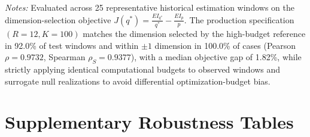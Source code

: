 \documentclass[review,12pt,authoryear]{elsarticle}
\begin{document}
\begin{table}[htbp]
\centering
\caption{Optimization Budget Calibration against High-Budget Reference Configuration ($R=25, K=150$).}
\label{tab:optimizer_calibration}
\begin{minipage}{\textwidth}
\vspace{4pt}
\scriptsize \emph{Notes:} Evaluated across 25 representative historical estimation windows on the dimension-selection objective $J(q^*) = \frac{EI_{q^*}}{q^*} - \frac{EI_p}{p}$. The production specification $(R=12, K=100)$ matches the dimension selected by the high-budget reference in 92.0\% of test windows and within $\pm 1$ dimension in 100.0\% of cases (Pearson $\rho = 0.9732$, Spearman $\rho_S = 0.9377$), with a median objective gap of 1.82\%, while strictly applying identical computational budgets to observed windows and surrogate null realizations to avoid differential optimization-budget bias.
\end{minipage}
\end{table}

\section{Supplementary Robustness Tables}
\label{app:robustness_tables}
\end{document}
